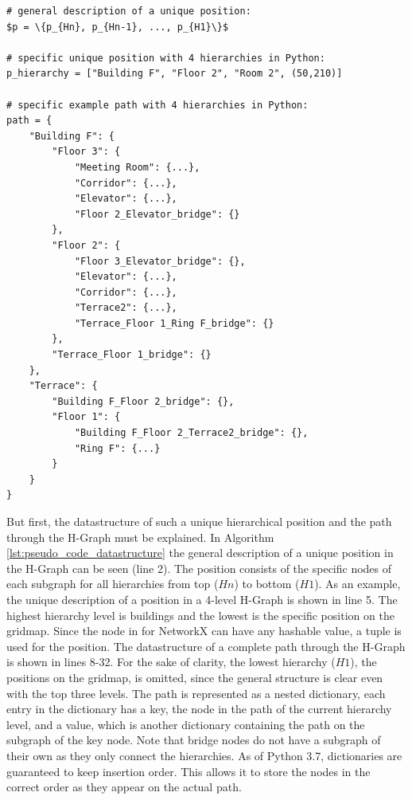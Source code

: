 \begin{lstlisting}[float=h]
# general description of a unique position:
$p = \{p_{Hn}, p_{Hn-1}, ..., p_{H1}\}$

# specific unique position with 4 hierarchies in Python:
p_hierarchy = ["Building F", "Floor 2", "Room 2", (50,210)]

# specific example path with 4 hierarchies in Python:
path = {
    "Building F": {
        "Floor 3": {
            "Meeting Room": {...},
            "Corridor": {...},
            "Elevator": {...},
            "Floor 2_Elevator_bridge": {}
        },
        "Floor 2": {
            "Floor 3_Elevator_bridge": {},
            "Elevator": {...},
            "Corridor": {...},
            "Terrace2": {...},
            "Terrace_Floor 1_Ring F_bridge": {}
        },
        "Terrace_Floor 1_bridge": {}
    },
    "Terrace": {
        "Building F_Floor 2_bridge": {},
        "Floor 1": {
            "Building F_Floor 2_Terrace2_bridge": {},
            "Ring F": {...}
        }
    }
}
\end{lstlisting}

But first, the datastructure of such a unique hierarchical position and the path through the H-Graph must be explained. In Algorithm \ref{lst:pseudo_code_datastructure} the general description of a unique position in the H-Graph can be seen (line 2). The position consists of the specific nodes of each subgraph for all hierarchies from top (\(Hn\)) to bottom (\(H1\)). As an example, the unique description of a position in a 4-level H-Graph is shown in line 5. The highest hierarchy level is buildings and the lowest is the specific position on the gridmap. Since the node in for NetworkX can have any hashable value, a tuple is used for the position. The datastructure of a complete path through the H-Graph is shown in lines 8-32. For the sake of clarity, the lowest hierarchy (\(H1\)), the positions on the gridmap, is omitted, since the general structure is clear even with the top three levels. The path is represented as a nested dictionary, each entry in the dictionary has a key, the node in the path of the current hierarchy level, and a value, which is another dictionary containing the path on the subgraph of the key node. Note that bridge nodes do not have a subgraph of their own as they only connect the hierarchies. As of Python 3.7, dictionaries are guaranteed to keep insertion order. This allows it to store the nodes in the correct order as they appear on the actual path. 

